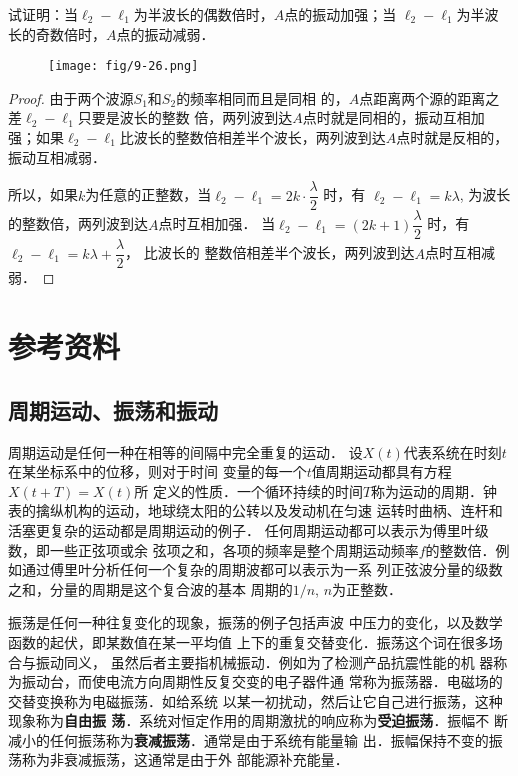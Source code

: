 \begin{enumerate}
试证明：当$\ell_2-\ell_1$为半波长的偶数倍时，$A$点的振动加强；当
$\ell_2-\ell_1$为半波长的奇数倍时，$A$点的振动减弱．

\begin{figure}[htp]\centering
    \texttt{[image: fig/9-26.png]}
    \caption{}
    \end{figure}

\begin{proof}
    由于两个波源$S_1$和$S_2$的频率相同而且是同相
    的，$A$点距离两个源的距离之差$\ell_2-\ell_1$只要是波长的整数
    倍，两列波到达$A$点时就是同相的，振动互相加强；如果$\ell_2-\ell_1$比波长的整数倍相差半个波长，两列波到达$A$点时就是反相的，振动互相减弱．

    所以，如果$k$为任意的正整数，当$\ell_2-\ell_1=2k\cdot \dfrac{\lambda}{2}$
    时，有
    $\ell_2-\ell_1=k\lambda$, 为波长的整数倍，两列波到达$A$点时互相加强．
    当$\ell_2-\ell_1=(2k+1)\dfrac{\lambda}{2}$
    时，有$\ell_2-\ell_1=k\lambda+\dfrac{\lambda}{2}$，
    比波长的
    整数倍相差半个波长，两列波到达$A$点时互相减弱．
\end{proof}
\end{enumerate}



\section{参考资料}
\subsection{周期运动、振荡和振动}
周期运动是任何一种在相等的间隔中完全重复的运动．
设$X(t)$代表系统在时刻$t$在某坐标系中的位移，则对于时间
变量的每一个$t$值周期运动都具有方程$X(t+T)=X(t)$所
定义的性质．一个循环持续的时间$T$称为运动的周期．钟
表的擒纵机构的运动，地球绕太阳的公转以及发动机在匀速
运转时曲柄、连杆和活塞更复杂的运动都是周期运动的例子．
任何周期运动都可以表示为傅里叶级数，即一些正弦项或余
弦项之和，各项的频率是整个周期运动频率$f$的整数倍．例
如通过傅里叶分析任何一个复杂的周期波都可以表示为一系
列正弦波分量的级数之和，分量的周期是这个复合波的基本
周期的$1/n$, $n$为正整数．

振荡是任何一种往复变化的现象，振荡的例子包括声波
中压力的变化，以及数学函数的起伏，即某数值在某一平均值
上下的重复交替变化．振荡这个词在很多场合与振动同义，
虽然后者主要指机械振动．例如为了检测产品抗震性能的机
器称为振动台，而使电流方向周期性反复交变的电子器件通
常称为振荡器．电磁场的交替变换称为电磁振荡．如给系统
以某一初扰动，然后让它自己进行振荡，这种现象称为\textbf{自由振
荡}．系统对恒定作用的周期激扰的响应称为\textbf{受迫振荡}．振幅不
断减小的任何振荡称为\textbf{衰减振荡}．通常是由于系统有能量输
出．振幅保持不变的振荡称为非衰减振荡，这通常是由于外
部能源补充能量．


